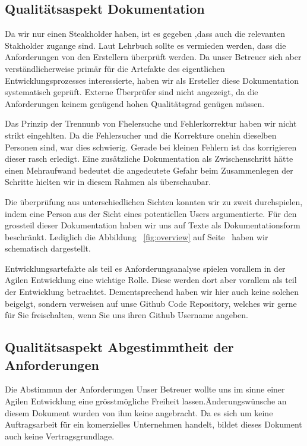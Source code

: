 \documentclass[11pt,titelpage]{scrartcl}
\begin{document}
\subsection{Qualitätsaspekt Dokumentation}
Da wir nur einen Steakholder haben, ist es gegeben ,dass auch die relevanten Stakholder zugange sind. Laut Lehrbuch sollte es vermieden werden, dass die Anforderungen von den Erstellern überprüft werden. Da unser Betreuer sich aber verständlicherweise primär für die Artefakte des eigentlichen Entwicklungsprozesses interessierte, haben wir als Ersteller diese Dokumentation systematisch geprüft. Externe Überprüfer sind nicht angezeigt, da die Anforderungen keinem genügend hohen Qualitätsgrad genügen müssen.

Das Prinzip der Trennunb von Fhelersuche und Fehlerkorrektur haben wir nicht strikt eingehlten. Da die Fehlersucher und die Korrekture onehin dieselben Personen sind, war dies schwierig. Gerade bei kleinen Fehlern ist das korrigieren dieser rasch erledigt. Eine zusätzliche Dokumentation als Zwischenschritt hätte einen Mehraufwand bedeutet die angedeutete Gefahr beim Zusammenlegen der Schritte hielten wir in diesem Rahmen als überschaubar.

Die überprüfung aus unterschiedlichen Sichten konnten wir zu zweit durchspielen, indem eine Person aus der Sicht eines potentiellen Users argumentierte.
Für den grossteil dieser Dokumentation haben wir uns auf Texte als Dokumentationsform beschränkt. Lediglich die Abbildung ~\ref{fig:overview} auf Seite~\pageref{fig:overview} haben wir schematisch dargestellt.

Entwicklungsartefakte als teil es Anforderungsanalyse spielen vorallem in der Agilen Entwicklung eine wichtige Rolle. Diese werden dort aber vorallem als teil der Entwicklung  betrachtet. Dementsprechend haben wir hier auch keine solchen beigelgt, sondern verweisen auf unse Github Code Repository, welches wir gerne für Sie freischalten, wenn Sie uns ihren Github Username angeben.


\subsection{Qualitätsaspekt Abgestimmtheit der Anforderungen}
Die Abstimmun der Anforderungen 
Unser Betreuer wollte uns im sinne einer Agilen Entwicklung eine grösstmögliche Freiheit lassen.Änderungswünsche an diesem Dokument wurden von ihm keine angebracht. Da es sich um keine Auftragsarbeit für ein komerzielles Unternehmen handelt, bildet dieses Dokument auch keine Vertragsgrundlage.
\end{document}
